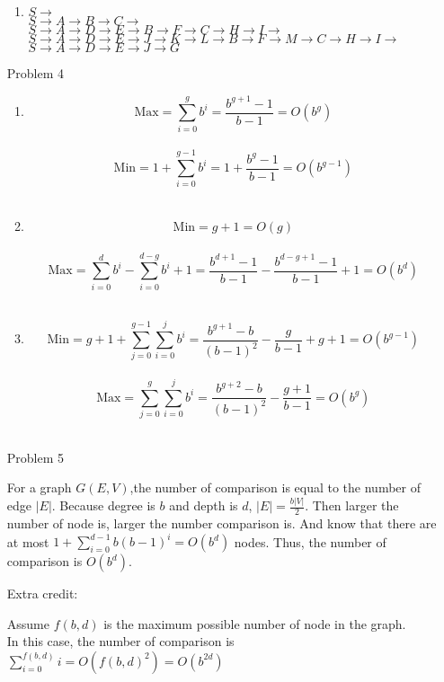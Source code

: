 \normalfont\documentclass[letterpaper,11pt]{article}
\begin{document}
\begin{enumerate}
\begin{enumerate}
		\item $S\to$\\
		$S\to A\to B\to C\to$\\
		$S\to A\to D\to E\to B\to F\to C\to H\to I\to$\\
		$S\to A\to D\to E\to J\to K\to L\to B\to F\to M\to C\to H\to I\to$\\
		$S\to A\to D\to E\to J\to G$
	\end{enumerate}
\item[Problem 4]\par
	\begin{enumerate}
		\item 
			$$\text{Max} = \sum_{i=0}^g{b^i} = \frac{b^{g+1} - 1}{b - 1} = O(b^g)$$\\
			$$\text{Min} = 1 + \sum_{i=0}^{g-1}{b^i} = 1 + \frac{b^{g} - 1}{b - 1} = O(b^{g-1})$$\\
		\item
			$$\text{Min} = g + 1 = O(g)$$\\
			$$\text{Max} = \sum_{i=0}^d{b^i} - \sum_{i=0}^{d-g}{b^i} + 1 = \frac{b^{d + 1} - 1}{b - 1} - \frac{b^{d-g + 1} - 1}{b - 1} + 1 = O(b^d)$$\\
		\item
			$$\text{Min} = g + 1 + \sum_{j=0}^{g-1}\sum_{i=0}^j{b^i} = \frac{b^{g+1} - b}{(b-1)^2} - \frac{g}{b-1} + g + 1 = O(b^{g-1})$$\\
			$$\text{Max} = \sum_{j=0}^{g}\sum_{i=0}^j{b^i} = \frac{b^{g+2} - b}{(b-1)^2} - \frac{g+1}{b-1} = O(b^g)$$\\
	\end{enumerate}
\item [Problem 5]\par
		For a graph $G(E,V)$,the number of comparison is equal to the number of edge $|E|$. Because degree is $b$ and depth is $d$, $|E| = \frac{b|V|}{2}$. Then larger the number of node is, larger the number comparison is. And know that there are at most $1 + \sum_{i=0}^{d-1}{b(b-1)^i} = O(b^d)$ nodes. Thus, the number of comparison is $O(b^d)$.\par
		Extra credit:\par
			Assume $f(b,d)$ is the maximum possible number of node in the graph.\\
			In this case, the number of comparison is $\sum_{i=0}^{f(b,d)}i = O(f(b,d)^2) = O(b^{2d})$



\end{enumerate}
\end{document}
